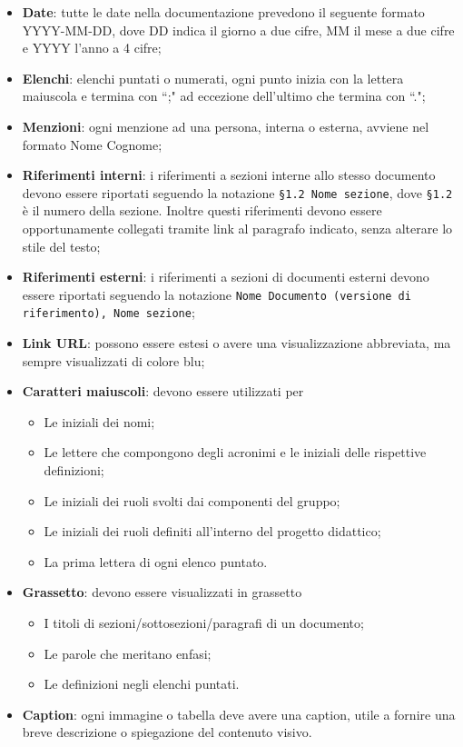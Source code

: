 \begin{itemize}
    \item \textbf{Date}: tutte le date nella documentazione prevedono il seguente formato YYYY-MM-DD, dove DD indica il giorno a due cifre, MM il mese a due cifre e YYYY l'anno a 4 cifre;
    \item \textbf{Elenchi}: elenchi puntati o numerati, ogni punto inizia con la lettera maiuscola e termina con ``;" ad eccezione dell'ultimo che termina con ``.";
    \item \textbf{Menzioni}: ogni menzione ad una persona, interna o esterna, avviene nel formato Nome Cognome;
    \item \textbf{Riferimenti interni}: i riferimenti a sezioni interne allo stesso documento devono essere riportati seguendo la notazione \texttt{§1.2 Nome sezione}, dove \texttt{§1.2} è il numero della sezione. Inoltre questi riferimenti devono essere opportunamente collegati tramite link al paragrafo indicato, senza alterare lo stile del testo;
    \item \textbf{Riferimenti esterni}: i riferimenti a sezioni di documenti esterni devono essere riportati seguendo la notazione \texttt{Nome Documento (versione di riferimento), Nome sezione};
     \item \textbf{Link URL}: possono essere estesi o avere una visualizzazione abbreviata, ma sempre visualizzati di colore blu;
    \item \textbf{Caratteri maiuscoli}: devono essere utilizzati per
        \begin{itemize}
            \item Le iniziali dei nomi;
            \item Le lettere che compongono degli acronimi e le iniziali delle rispettive definizioni;
            \item Le iniziali dei ruoli svolti dai componenti del gruppo;
            \item Le iniziali dei ruoli definiti all'interno del progetto didattico;
            \item La prima lettera di ogni elenco puntato.
        \end{itemize}
    \item \textbf{Grassetto}: devono essere visualizzati in grassetto
        \begin{itemize}
            \item I titoli di sezioni/sottosezioni/paragrafi di un documento;
            \item Le parole che meritano enfasi;
            \item Le definizioni negli elenchi puntati.
        \end{itemize}
    \item \textbf{Caption}: ogni immagine o tabella deve avere una caption, utile a fornire una breve descrizione o spiegazione del contenuto visivo.
\end{itemize}

